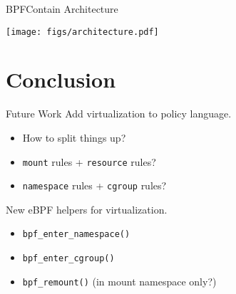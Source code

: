 \documentclass[12pt, dvipsnames, aspectratio=169]{beamer}
\begin{document}

\begin{frame}[c]{BPFContain Architecture}
\begin{center}
  \color{black}
  \texttt{[image: figs/architecture.pdf]}
\end{center}
\end{frame}

\section{Conclusion}

\begin{frame}[c]{Future Work}
Add virtualization to policy language.
\begin{itemize}
  \item How to split things up?
  \item \texttt{mount} rules + \texttt{resource} rules?
  \item \texttt{namespace} rules + \texttt{cgroup} rules?
\end{itemize}
\vfill
New eBPF helpers for virtualization.
\begin{itemize}
  \item \texttt{bpf\_enter\_namespace()}
  \item \texttt{bpf\_enter\_cgroup()}
  \item \texttt{bpf\_remount()} (in mount namespace only?)
\end{itemize}
\vfill
\end{frame}
\end{document}
